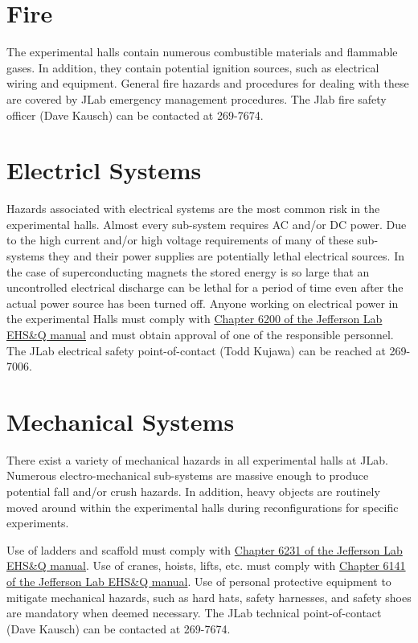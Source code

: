 \section{Fire}

	The experimental halls contain numerous combustible materials and flammable gases. 
In addition, they contain potential ignition sources, such as electrical wiring and equipment. 
General fire hazards and procedures for dealing with these are covered by JLab emergency 
management procedures. The Jlab fire safety officer (Dave Kausch) can be contacted at 269-7674.

\section{Electricl Systems}

	Hazards associated with electrical systems are the most common risk in the experimental halls. 
Almost every sub-system requires AC and/or DC power. Due to the high current and/or high voltage 
requirements of many of these sub-systems they and their power supplies are potentially lethal 
electrical sources. In the case of superconducting magnets the stored energy is so large that 
an uncontrolled electrical discharge can be lethal for a period of time even after the actual 
power source has been turned off.  Anyone working on electrical power in the experimental Halls 
must comply with \href{http://www.jlab.org/ehs/ehsmanual/manual/6200.html}{Chapter 6200 of the Jefferson Lab EHS\&Q manual}
and must obtain approval of one of the responsible personnel. 
The JLab electrical safety point-of-contact (Todd Kujawa) can be reached at 269-7006.

\section{Mechanical Systems}

	There exist a variety of mechanical hazards in all experimental halls at JLab. 
Numerous electro-mechanical sub-systems are massive enough to produce potential fall 
and/or crush hazards.  In addition, heavy objects are routinely moved around within 
the experimental halls during reconfigurations for specific experiments. 

Use of ladders and scaffold must comply 
with \href{http://www.jlab.org/ehs/ehsmanual/manual/6132.html}{Chapter 6231 of the 
Jefferson Lab EHS\&Q manual}.
Use of cranes, hoists, lifts, etc. must comply with
\href{http://www.jlab.org/ehs/ehsmanual/manual/6141.html}{Chapter 6141 of the 
Jefferson Lab EHS\&Q manual}. 
Use of personal protective equipment 
to mitigate mechanical hazards, such as hard hats, safety harnesses, and safety 
shoes are mandatory when deemed necessary.
The JLab technical point-of-contact (Dave Kausch) can be contacted at 269-7674.

